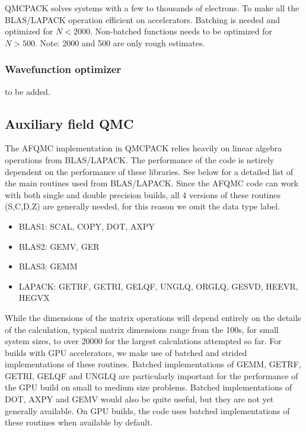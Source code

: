 QMCPACK solves systems with a few to thousands of electrons. To make all the BLAS/LAPACK operation efficient on accelerators.
Batching is needed and optimized for $N < 2000$. Non-batched functions needs to be optimized for $N > 500$.
Note: 2000 and 500 are only rough estimates.

\subsubsection{Wavefunction optimizer}
to be added.

\subsection{Auxiliary field QMC}

The AFQMC implementation in QMCPACK relies heavily on linear algebra operations from BLAS/LAPACK. The performance of the code is netirely dependent on the performance of these libraries. See below for a detailed list of the main routines used from BLAS/LAPACK. Since the AFQMC code can work with both single and double precision builds, all 4 versions of these routines (S,C,D,Z) are generally needed, for this reason we omit the data type label.

\begin{itemize}
 \item BLAS1: SCAL, COPY, DOT, AXPY
 \item BLAS2: GEMV, GER
 \item BLAS3: GEMM
 \item LAPACK: GETRF, GETRI, GELQF, UNGLQ, ORGLQ, GESVD, HEEVR, HEGVX
\end{itemize}

While the dimensions of the matrix operations will depend entirely on the details of the calculation, typical matrix dimensions range from the 100s, for small system sizes, to over 20000 for the largest calculations attempted so far.
For builds with GPU accelerators, we make use of batched and strided implementations of these routines. Batched implementations of GEMM, GETRF, GETRI, GELQF and UNGLQ are particularly important for the performance of the GPU build on small to medium size problems. Batched implementations of DOT, AXPY and GEMV would also be quite useful, but they are not yet generally available.
On GPU builds, the code uses batched implementations of these routines when available by default.
